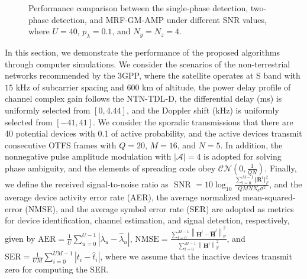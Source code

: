 \documentclass[conference]{IEEEtran}
\begin{document}
\begin{figure}
{\begin{minipage}{5.7cm}
			\end{minipage}
		}
		\caption{Performance comparison between the single-phase detection, two-phase detection, and MRF-GM-AMP under different SNR values, where $U = 40$, $p_{\lambda}=0.1$, and $N_y=N_z=4$.} 
		\label{PCall}
	\end{figure}
	In this section, we demonstrate the performance of the proposed algorithms through computer simulations. We consider the scenarios of the non-terrestrial networks recommended by the 3GPP\cite{3gpp}, where the satellite operates at S band with $15$ kHz of subcarrier spacing and 600 km of altitude, the power delay profile of channel complex gain follows the NTN-TDL-D, the differential delay (ms) is uniformly selected from $[0,4.44]$, and the Doppler shift (kHz) is uniformly selected from $[-41,41]$. We consider the sporadic transmissions that there are 40 potential devices with 0.1 of active probability, and the active devices transmit consecutive OTFS frames with $Q=20$, $M=16$, and $N=5$. In addition, the nonnegative pulse amplitude
	modulation \cite{Joint2} with $|\mathcal A|=4$ is adopted for solving phase ambiguity, and the elements of spreading code obey $\mathcal{CN}(0,\frac{1}{Q N})$. Finally, we define the received signal-to-noise ratio as $\text{ SNR }=10\log_{10}\frac{\sum_{l=0}^{M-1}\Vert \mathbf R^l\Vert^2_F}{QMNN_a\sigma^2}$, and the average device activity error rate (AER), the average normalized mean-squared-error (NMSE), and the average symbol error rate (SER) are adopted as metrics for device identification, channel estimation, and signal detection, respectively, given by
	$\text{AER} = \frac{1}{U}\sum_{u=0}^{U-1}\left|\lambda_u-\hat \lambda_u\right|$,
	$\text{NMSE}=\frac{\sum_{l=0}^{M-1}\left\| \mathbf H^l-\hat{\mathbf H}^l\right\|^2_{\mathrm{F}}}{\sum_{l=0}^{M-1}\left\|\mathbf H^l\right\|^2_{\mathrm{F}}}$, and
	$\text{SER} = \frac{1}{UM}\sum_{i=0}^{UM-1} \left|t_i - \hat t_i\right|$,
	where we assume that the inactive devices transmit zero for computing the SER.
	
\end{document}
